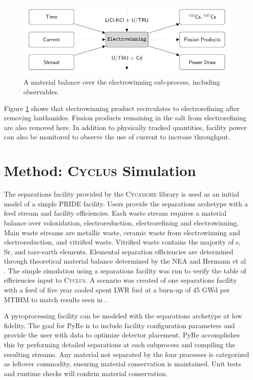\documentclass{anstrans}
\newcommand{\Cyclus}{\textsc{Cyclus}\xspace}%
\newcommand{\Cycamore}{\textsc{Cycamore}\xspace}%
\begin{document}
\begin{figure}[ht]
	\centering
	\includegraphics[width=1\linewidth]{winning}
	\caption{A material balance over the electrowinning sub-process, including observables.}
	\label{fig:winning}
\end{figure}

Figure \ref{fig:winning} shows that electrowinning product recirculates to electrorefining after removing lanthanides.
Fission products remaining in the salt from electrorefining are also removed here. In addition to physically tracked 
quantities, facility power can also be monitored to observe the use of current to increase throughput. 
\section{Method: \Cyclus Simulation}
The separations facility provided by the \Cycamore library is used as an 
initial model of a simple \gls{PRIDE} facility. 
Users provide the separations archetype with a feed stream and facility efficiencies.  
Each waste stream requires a material balance over voloxidation, electroreduction, electrorefining and electrowinning. Main 
waste streams are metallic waste, ceramic waste from electrowinning and electroreduction, and vitrified waste. Vitrified 
waste contains the majority of s, Sr, and rare-earth elements. Elemental separation efficiencies are 
determined through theoretical material balance determined by the NEA and Hermann et al \cite{flowsheet_1998,herrmann_separation_2010}. 
The simple simulation using a separations facility was run to verify the table of efficiencies input to \Cyclus. A scenario was 
created of one separations facility with a feed of five year cooled spent \Gls{LWR} 
fuel at a burn-up of 45 \gls{GWd} per \gls{MTIHM} to 
match results seen in \cite{flowsheet_1998}.

A pyroprocessing facility can be modeled with the separations archetype at low fidelity. 
The goal for \Gls{PyRe} is to include facility configuration parameters and provide the user with data to optimize detector placement.
\Gls{PyRe} accomplishes this by performing detailed separations at each subprocess and compiling the resulting streams.
Any material not separated by the four processes is categorized as leftover commodity, ensuring material conservation is maintained. 
Unit tests and runtime checks will confirm material conservation.  
\end{document}
